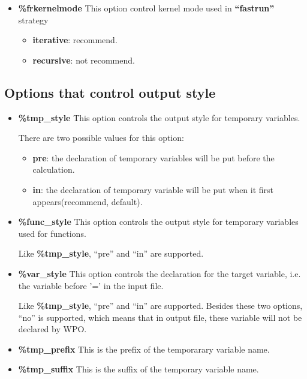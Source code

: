 \documentclass[a4paper]{article}
\begin{document}
\begin{itemize}
\item \textbf{\%frkernelmode}
This option control kernel mode used in \textbf{``fastrun''} strategy
\begin{itemize}
\item \textbf{iterative}: recommend.
\item \textbf{recursive}: not recommend.
\end{itemize}
\end{itemize}

\subsection{Options that control output style}
\begin{itemize}
\item \textbf{\%tmp\_style}
This option controls the output style for temporary variables.

There are two possible values for this option:
\begin{itemize}
\item \textbf{pre}: the declaration of temporary variables will be put before the calculation.
\item \textbf{in}: the declaration of temporary variable will be put when it first appears(recommend, default).
\end{itemize}


\item \textbf{\%func\_style}
This option controls the output style for temporary variables used for functions.

Like \textbf{\%tmp\_style}, ``pre'' and ``in'' are supported.

\item \textbf{\%var\_style}
This option controls the declaration for the target variable, i.e. the variable before '=' in the input file.

Like \textbf{\%tmp\_style}, ``pre'' and ``in'' are supported. Besides these two options, ``no'' is supported, which means that in output file, these variable will not be declared by WPO.

\item \textbf{\%tmp\_prefix}
This is the prefix of the temporarary variable name.
\item \textbf{\%tmp\_suffix}
This is the suffix of the temporary variable name.


\end{itemize}
\end{document}
